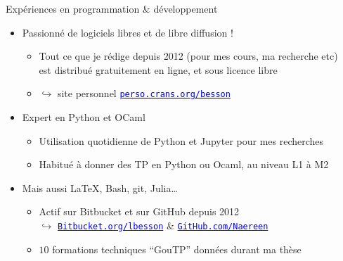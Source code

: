 \documentclass[11pt,english,ignorenonframetext,]{beamer}
\providecommand{\tightlist}{%
  \setlength{\itemsep}{0pt}\setlength{\parskip}{0pt}}
\begin{document}
\begin{frame}{Expériences en programmation \& développement}

\begin{itemize}
\item
  Passionné de logiciels libres et de libre diffusion !

  \begin{itemize}\tightlist
    \item
      Tout ce que je rédige depuis 2012 (pour mes cours, ma recherche etc)\\
      est distribué gratuitement en ligne, et sous licence libre
  \item[]
    \(\hookrightarrow\)
    site personnel
    \href{https://perso.crans.org/besson}{\textcolor{blue}{\texttt{perso.crans.org/besson}}}
  \end{itemize}

\pause
\vspace*{7pt}
\item
  \alert{Expert en Python et OCaml}

  \begin{itemize}
  \tightlist
  \item
    Utilisation quotidienne de Python et Jupyter pour mes recherches
  \item
    Habitué à donner des TP en Python ou Ocaml, au niveau L1 à M2
  \end{itemize}

\pause
\vspace*{7pt}
\item
  Mais aussi \LaTeX, Bash, git, Julia\ldots{}

  \begin{itemize}
  \tightlist
  \item
    Actif sur Bitbucket et sur GitHub depuis 2012 \\
    \(\hookrightarrow\)
    \href{https://Bitbucket.org/lbesson}{\textcolor{blue}{\texttt{Bitbucket.org/lbesson}}}
    \&
    \href{https://GitHub.com/Naereen}{\textcolor{blue}{\texttt{GitHub.com/Naereen}}}
  \item
    \(10\) formations techniques ``GouTP'' données durant ma thèse
  \end{itemize}

\end{itemize}

\end{frame}
\end{document}

